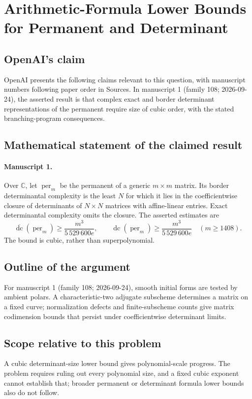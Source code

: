 \documentclass[11pt]{article}
\begin{document}
\section*{Arithmetic-Formula Lower Bounds for Permanent and Determinant}

\subsection{OpenAI's claim}
OpenAI presents the following claims relevant to this question, with manuscript numbers following paper order in Sources. In manuscript 1 (family 108; 2026-09-24), the asserted result is that complex exact and border determinant representations of the permanent require size of cubic order, with the stated branching-program consequences.

\subsection{Mathematical statement of the claimed result}
\paragraph{Manuscript 1.}
Over $\mathbb C$, let $\operatorname{per}_m$ be the permanent of a generic $m\times m$ matrix. Its border determinantal complexity is the least $N$ for which it lies in the coefficientwise closure of determinants of $N\times N$ matrices with affine-linear entries. Exact determinantal complexity omits the closure. The asserted estimates are
\[
 \overline{\operatorname{dc}}(\operatorname{per}_m)\ge\frac{m^3}{5\,529\,600e},\qquad
 \operatorname{dc}(\operatorname{per}_m)\ge\frac{m^3}{5\,529\,600e}\quad(m\ge1408).
\]
The bound is cubic, rather than superpolynomial.

\subsection{Outline of the argument}
For manuscript 1 (family 108; 2026-09-24), smooth initial forms are tested by ambient polars. A characteristic-two adjugate subscheme determines a matrix on a fixed curve; normalization defects and finite-subscheme counts give matrix codimension bounds that persist under coefficientwise determinant limits.

\subsection{Scope relative to this problem}
A cubic determinant-size lower bound gives polynomial-scale progress. The problem requires ruling out every polynomial size, and a fixed cubic exponent cannot establish that; broader permanent or determinant formula lower bounds also do not follow.
\end{document}
